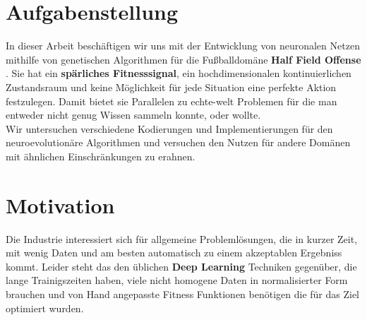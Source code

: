 \section{Aufgabenstellung}

In dieser Arbeit beschäftigen wir uns mit der Entwicklung von neuronalen Netzen mithilfe von genetischen Algorithmen für die Fußballdomäne \textbf{Half Field Offense} \cite{hfo}. Sie hat ein \textbf{spärliches Fitnesssignal}, ein hochdimensionalen kontinuierlichen Zustandsraum und keine Möglichkeit für jede Situation eine perfekte Aktion festzulegen. Damit bietet sie Parallelen zu echte-welt Problemen für die man entweder nicht genug Wissen sammeln konnte, oder wollte.  \\

\noindent
Wir untersuchen verschiedene Kodierungen und Implementierungen für den neuroevolutionäre Algorithmen und versuchen den Nutzen für andere Domänen mit ähnlichen Einschränkungen zu erahnen.\\


\newpage
\section{Motivation}
Die Industrie interessiert sich für allgemeine Problemlösungen, die in kurzer Zeit, mit wenig Daten und am besten automatisch zu einem akzeptablen Ergebniss kommt. Leider steht das den üblichen \textbf{Deep Learning} Techniken gegenüber, die lange Trainigszeiten haben, viele nicht homogene Daten in normalisierter Form brauchen und von Hand angepasste Fitness Funktionen benötigen die für das Ziel optimiert wurden. \\

